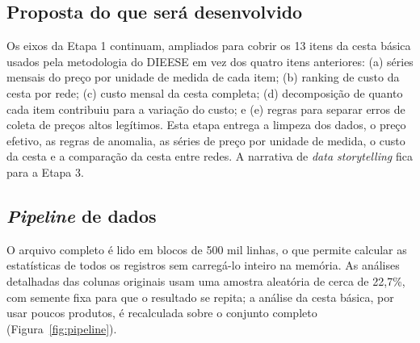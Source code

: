 \documentclass[11pt,a4paper]{article}
\begin{document}
\subsection{Proposta do que será desenvolvido}

Os eixos da Etapa 1 continuam, ampliados para cobrir os 13 itens da cesta básica usados pela metodologia do DIEESE em vez dos quatro itens anteriores: (a) séries mensais do preço por unidade de medida de cada item; (b) ranking de custo da cesta por rede; (c) custo mensal da cesta completa; (d) decomposição de quanto cada item contribuiu para a variação do custo; e (e) regras para separar erros de coleta de preços altos legítimos. Esta etapa entrega a limpeza dos dados, o preço efetivo, as regras de anomalia, as séries de preço por unidade de medida, o custo da cesta e a comparação da cesta entre redes. A narrativa de \textit{data storytelling} fica para a Etapa 3.

\subsection{\textit{Pipeline} de dados}

O arquivo completo é lido em blocos de 500 mil linhas, o que permite calcular as estatísticas de todos os registros sem carregá-lo inteiro na memória. As análises detalhadas das colunas originais usam uma amostra aleatória de cerca de 22,7\%, com semente fixa para que o resultado se repita; a análise da cesta básica, por usar poucos produtos, é recalculada sobre o conjunto completo (Figura~\ref{fig:pipeline}).
\end{document}
